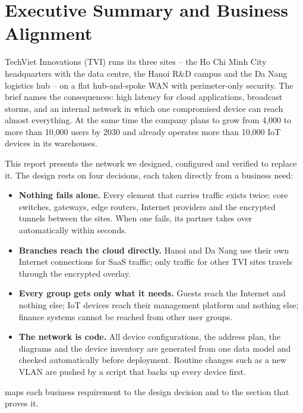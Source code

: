 \section{Executive Summary and Business Alignment}\label{sec:exec}

TechViet Innovations (TVI) runs its three sites -- the Ho Chi Minh City headquarters with the data centre,
the Hanoi R\&D campus and the Da Nang logistics hub -- on a flat hub-and-spoke WAN with perimeter-only
security. The brief names the consequences: high latency for cloud applications, broadcast storms, and an
internal network in which one compromised device can reach almost everything. At the same time the company
plans to grow from 4{,}000 to more than 10{,}000 users by 2030 and already operates more than 10{,}000 IoT
devices in its warehouses.

This report presents the network we designed, configured and verified to replace it. The design rests on
four decisions, each taken directly from a business need:

\begin{itemize}
  \item \textbf{Nothing fails alone.} Every element that carries traffic exists twice: core switches,
        gateways, edge routers, Internet providers and the encrypted tunnels between the sites. When one
        fails, its partner takes over automatically within seconds.
  \item \textbf{Branches reach the cloud directly.} Hanoi and Da Nang use their own Internet connections for
        SaaS traffic; only traffic for other TVI sites travels through the encrypted overlay.
  \item \textbf{Every group gets only what it needs.} Guests reach the Internet and nothing else; IoT devices
        reach their management platform and nothing else; finance systems cannot be reached from other user
        groups.
  \item \textbf{The network is code.} All \FactNumConfigs{} device configurations, the address plan, the
        diagrams and the device inventory are generated from one data model and checked automatically
        before deployment. Routine changes such as a new VLAN are pushed by a script that backs up every
        device first.
\end{itemize}

 maps each business requirement to the design decision and to the section that proves it.

